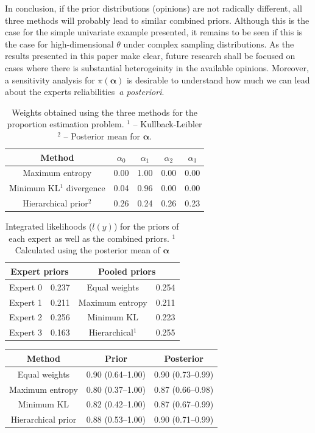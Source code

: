 \documentclass[a4paper, notitlepage, 11pt]{article}
\begin{document}
In conclusion, if the prior distributions (opinions) are not radically different, all three methods will probably lead to similar combined priors.
Although this is the case for the simple univariate example presented, it remains to be seen if this is the case for high-dimensional $\theta$ under complex sampling distributions.
As the results presented in this paper make clear, future research shall be focused on cases where there is substantial heterogeinity in the available opinions.
Moreover, a sensitivity analysis for $\pi(\boldsymbol\alpha)$ is desirable to understand how much we can lead about the experts reliabilities~\textit{a posteriori}.

\begin{table}[ht]
\caption{Weights obtained using the three methods for the proportion estimation problem. $^1$ -- Kullback-Leibler $^2$ -- Posterior mean for $\boldsymbol\alpha$.}
\centering
\begin{tabular}{ccccc}
  \hline
Method  & $\alpha_0$ & $\alpha_1$ & $\alpha_2$ & $\alpha_3$ \\ 
  \hline
Maximum entropy & 0.00 & 1.00 & 0.00 & 0.00 \\ 
Minimum KL$^1$ divergence& 0.04 & 0.96 & 0.00 & 0.00 \\ 
Hierarchical prior$^2$ & 0.26 & 0.24 & 0.26 & 0.23 \\ 
   \hline
\end{tabular}
\label{tab:alphasBeta}
\end{table}

\begin{table}[ht]
\caption{Integrated likelihoods ($l(y)$) for the priors of each expert as well as the combined priors.
$^1$ Calculated using the posterior mean of $\boldsymbol\alpha$}
\centering
\begin{tabular}{cccc}
   \hline
   \multicolumn{2}{c}{Expert priors} &  \multicolumn{2}{c}{Pooled priors} \\
   \hline
   Expert 0 & 0.237 & Equal weights & 0.254\\
   Expert 1 & 0.211 & Maximum entropy & 0.211 \\
   Expert 2 & 0.256 & Minimum KL & 0.223\\ 
   Expert 3 & 0.163 & Hierarchical$^1$ & 0.255 \\
   \hline
\end{tabular}
\label{tab:marglikes}
\end{table}
\begin{table}[ht]
\centering
\begin{tabular}{ccc}
 \hline
Method & Prior & Posterior  \\ 
 \hline
 Equal weights & 0.90 (0.64--1.00) & 0.90 (0.73--0.99) \\ 
 Maximum entropy & 0.80 (0.37--1.00) & 0.87 (0.66--0.98) \\ 
 Minimum KL  & 0.82 (0.42--1.00) & 0.87 (0.67--0.99) \\ 
 Hierarchical prior & 0.88 (0.53--1.00) & 0.90 (0.71--0.99) \\ 
  \hline
\end{tabular}
\label{tab:prior_posteriorsBeta}
\end{table}
\end{document}
